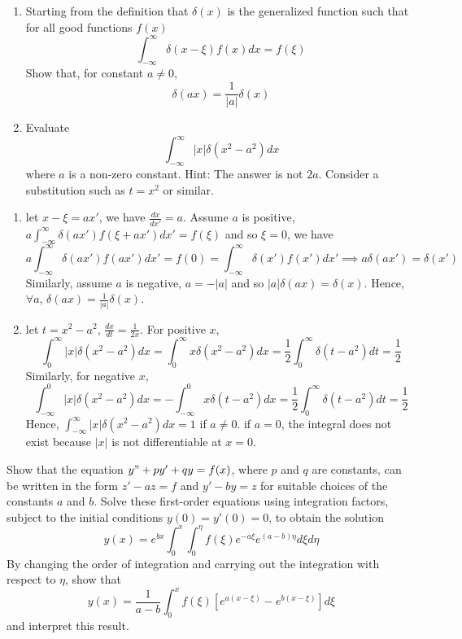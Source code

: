 \documentclass[a4paper]{article}
\begin{document}
\begin{qns}\leavevmode
\begin{enumerate}[label=(\alph*)]
    \item Starting from the definition that $\delta(x)$ is the generalized function such that for all good functions $f(x)$
$$\int_{-\infty}^\infty\delta(x-\xi)f(x)dx=f(\xi)$$
Show that, for constant $a\neq 0$, 
$$\delta(ax)=\frac{1}{|a|}\delta(x)$$
\item  Evaluate 
$$\int_{-\infty}^\infty|x|\delta(x^2-a^2)dx$$
where $a$ is a non-zero constant. Hint: The answer is not $2a$. Consider a substitution such as $t=x^2$ or similar.
\end{enumerate}
\end{qns}
\begin{ans}\leavevmode
\begin{enumerate}[label=(\alph*)]
    \item let $x-\xi=ax'$, we have $\frac{dx}{dx'}=a$. Assume $a$ is positive, $a\int_{-\infty}^\infty\delta(ax')f(\xi+ax')dx'=f(\xi)$ and so $\xi=0$, we have
$$a\int_{-\infty}^\infty\delta(ax')f(ax')dx'=f(0)=\int_{-\infty}^\infty\delta(x')f(x')dx'\implies a\delta(ax')=\delta(x')$$
Similarly, assume $a$ is negative, $a=-|a|$ and so $|a|\delta(ax)=\delta(x)$. Hence, $\forall a$, $\delta(ax)=\frac{1}{|a|}\delta(x)$.
\item let $t=x^2-a^2$, $\frac{dx}{dt}=\frac{1}{2x}$. For positive $x$,
$$\int_0^\infty|x|\delta(x^2-a^2)dx=\int_0^\infty x\delta(x^2-a^2)dx=\frac{1}{2}\int_0^\infty\delta(t-a^2)dt=\frac{1}{2}$$
Similarly, for negative $x$,
$$\int_{-\infty}^0|x|\delta(x^2-a^2)dx=-\int_{-\infty}^0x\delta(t-a^2)dx=\frac{1}{2}\int_0^\infty\delta(t-a^2)dt=\frac{1}{2}$$
Hence, $\int_{-\infty}^\infty|x|\delta(x^2-a^2)dx=1$ if $a\neq 0$. if $a=0$, the integral does not exist because $|x|$ is not differentiable at $x=0$.
\end{enumerate}
\end{ans}
\newpage
\begin{qns}
Show that the equation $y"+py'+qy=f(x)$, where $p$ and $q$ are constants, can be written in the form $z'-az=f$ and $y'-by=z$ for suitable choices of the constants $a$ and $b$. Solve these first-order equations using integration factors, subject to the initial conditions $y(0)=y'(0)=0$, to obtain the solution
$$y(x)=e^{bx}\int_0^x\int_0^\eta f(\xi)e^{-a\xi}e^{(a-b)\eta}d\xi d\eta$$
By changing the order of integration and carrying out the integration with respect to $\eta$, show that
$$y(x)=\frac{1}{a-b}\int_0^xf(\xi)[e^{a(x-\xi)}-e^{b(x-\xi)}]d\xi$$
and interpret this result.
\end{qns}
\end{document}
